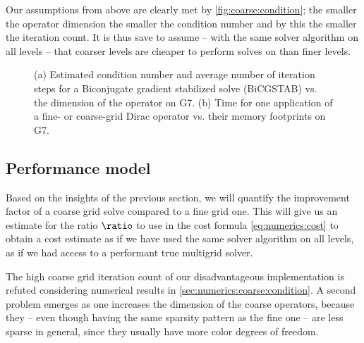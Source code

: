 Our assumptions from above are clearly met by \cref{fig:coarse:condition}; the smaller the operator dimension the smaller the condition number and by this the smaller the iteration count.
It is thus save to assume -- with the same solver algorithm on all levels -- that coarser levels are cheaper to perform solves on than finer levels.


\begin{figure}
\centering

\hfill
{}

\caption{
(a) Estimated condition number and average number of iteration steps for a Biconjugate gradient stabilized solve (BiCGSTAB) vs. the dimension of the operator on G7. \takenfull
(b) Time for one application of a fine- or coarse-grid Dirac operator vs. their memory footprints on G7.
}
\label{fig:coarse}
\end{figure}

\subsection{Performance model}
\label{sec:numerics:performance:model}

Based on the insights of the previous section, we will quantify the improvement factor of a coarse grid solve compared to a fine grid one.
This will give us an estimate for the ratio $\ratio$ to use in the cost formula \cref{eq:numerics:cost} to obtain a cost estimate as if we have used the same solver algorithm on all levels, \ie as if we had access to a performant true multigrid solver.

The high coarse grid iteration count of our disadvantageous implementation is refuted considering numerical results in \cref{sec:numerics:coarse:condition}.
A second problem emerges as one increases the dimension of the coarse operators, because they -- even though having the same sparsity pattern as the fine one -- are less sparse in general, since they usually have more color degrees of freedom.

